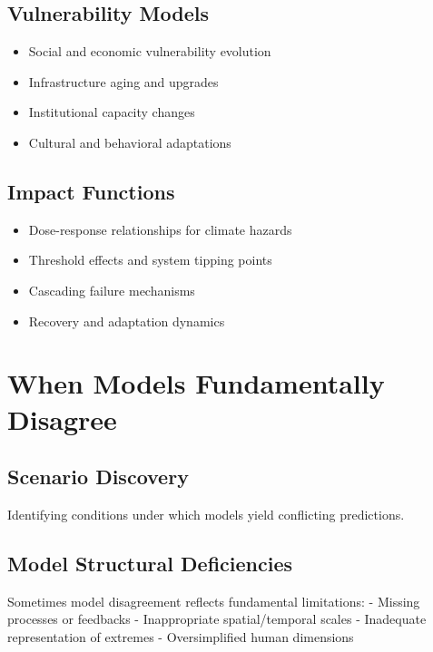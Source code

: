 \documentclass[
  letterpaper,
  DIV=11,
  numbers=noendperiod]{scrreprt}
\providecommand{\tightlist}{%
  \setlength{\itemsep}{0pt}\setlength{\parskip}{0pt}}
\begin{document}
\subsection{Vulnerability Models}\label{vulnerability-models}

\begin{itemize}
\tightlist
\item
  Social and economic vulnerability evolution
\item
  Infrastructure aging and upgrades
\item
  Institutional capacity changes
\item
  Cultural and behavioral adaptations
\end{itemize}

\subsection{Impact Functions}\label{impact-functions}

\begin{itemize}
\tightlist
\item
  Dose-response relationships for climate hazards
\item
  Threshold effects and system tipping points
\item
  Cascading failure mechanisms
\item
  Recovery and adaptation dynamics
\end{itemize}

\section{When Models Fundamentally
Disagree}\label{when-models-fundamentally-disagree}

\subsection{Scenario Discovery}\label{scenario-discovery}

Identifying conditions under which models yield conflicting predictions.

\subsection{Model Structural
Deficiencies}\label{model-structural-deficiencies}

Sometimes model disagreement reflects fundamental limitations: - Missing
processes or feedbacks - Inappropriate spatial/temporal scales -
Inadequate representation of extremes - Oversimplified human dimensions
\end{document}
